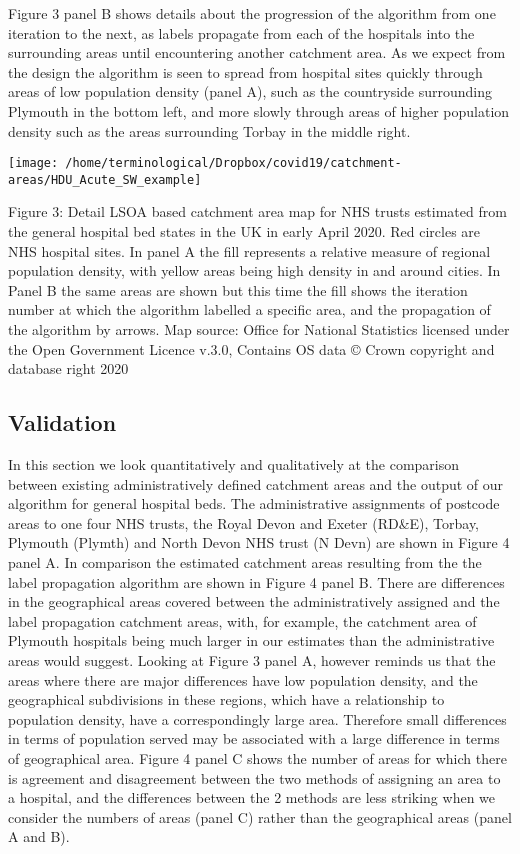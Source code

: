 \documentclass[
]{article}
\begin{document}
Figure 3 panel B shows details about the progression of the algorithm
from one iteration to the next, as labels propagate from each of the
hospitals into the surrounding areas until encountering another
catchment area. As we expect from the design the algorithm is seen to
spread from hospital sites quickly through areas of low population
density (panel A), such as the countryside surrounding Plymouth in the
bottom left, and more slowly through areas of higher population density
such as the areas surrounding Torbay in the middle right.

\begin{center}\texttt{[image: /home/terminological/Dropbox/covid19/catchment-areas/HDU\_Acute\_SW\_example]} \end{center}

Figure 3: Detail LSOA based catchment area map for NHS trusts estimated
from the general hospital bed states in the UK in early April 2020. Red
circles are NHS hospital sites. In panel A the fill represents a
relative measure of regional population density, with yellow areas being
high density in and around cities. In Panel B the same areas are shown
but this time the fill shows the iteration number at which the algorithm
labelled a specific area, and the propagation of the algorithm by
arrows. Map source: Office for National Statistics licensed under the
Open Government Licence v.3.0, Contains OS data © Crown copyright and
database right 2020

\hypertarget{validation}{%
\subsection{Validation}\label{validation}}

In this section we look quantitatively and qualitatively at the
comparison between existing administratively defined catchment areas and
the output of our algorithm for general hospital beds. The
administrative assignments of postcode areas to one four NHS trusts, the
Royal Devon and Exeter (RD\&E), Torbay, Plymouth (Plymth) and North
Devon NHS trust (N Devn) are shown in Figure 4 panel A. In comparison
the estimated catchment areas resulting from the the label propagation
algorithm are shown in Figure 4 panel B. There are differences in the
geographical areas covered between the administratively assigned and the
label propagation catchment areas, with, for example, the catchment area
of Plymouth hospitals being much larger in our estimates than the
administrative areas would suggest. Looking at Figure 3 panel A, however
reminds us that the areas where there are major differences have low
population density, and the geographical subdivisions in these regions,
which have a relationship to population density, have a correspondingly
large area. Therefore small differences in terms of population served
may be associated with a large difference in terms of geographical area.
Figure 4 panel C shows the number of areas for which there is agreement
and disagreement between the two methods of assigning an area to a
hospital, and the differences between the 2 methods are less striking
when we consider the numbers of areas (panel C) rather than the
geographical areas (panel A and B).
\end{document}
